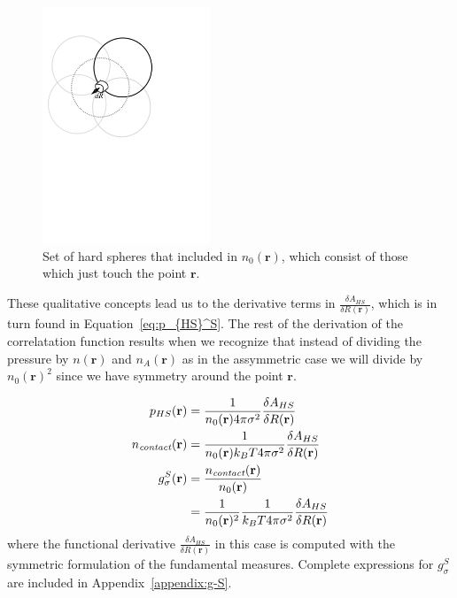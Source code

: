 \documentclass[letterpaper,twocolumn,amsmath,amssymb,jcp,10pt,aip]{revtex4-1}
\newcommand{\rr}{\textbf{r}}
\begin{document}
\begin{figure}
\includegraphics[width=5cm]{figs/contact}
\caption{Set of hard spheres that included in $n_0(\mathbf{r})$, which
  consist of those which just touch the point $\mathbf{r}$.}
\label{fig:contact}
\end{figure}

These qualitative concepts lead us to the derivative terms in $\frac{\delta A_{HS}}{\delta R(\mathbf{r})}$, 
which is in turn found in Equation~\ref{eq:p_{HS}^S}.  The rest of the 
derivation of the correlatation function results when we recognize that 
instead of dividing the pressure by $n(\mathbf{r})$ and $n_A(\mathbf{r})$ 
as in the assymmetric case we will divide by $n_0(\mathbf{r})^2$
since we have symmetry around the point $\mathbf{r}$.

\begin{align}
  p_{HS}(\mathbf{r}) &= \frac{1}{n_0(\rr) 4\pi \sigma^2} \frac{\delta
    A_{HS}}{\delta R(\mathbf{r})} \label{eq:p_{HS}^S}\\
  \ncontact(\rr) &= \frac{1}{n_0(\rr) k_BT 4\pi \sigma^2} \frac{\delta
    A_{HS}}{\delta R(\mathbf{r})} \\
  g_\sigma^S(\rr) &= \frac{\ncontact(\rr)}{n_0(\rr)} \\
  &= \frac{1}{n_0(\rr)^2}\frac{1}{ k_BT 4\pi \sigma^2} \frac{\delta
    A_{HS}}{\delta R(\mathbf{r})} \label{eq:g-A-exact}
\end{align}
where the functional derivative $\frac{\delta A_{HS}}{\delta
  R(\mathbf{r})}$ in this case is computed with the symmetric
formulation of the fundamental measures.  Complete expressions for
$g_\sigma^S$ are included in Appendix~\ref{appendix:g-S}.\\
\end{document}
